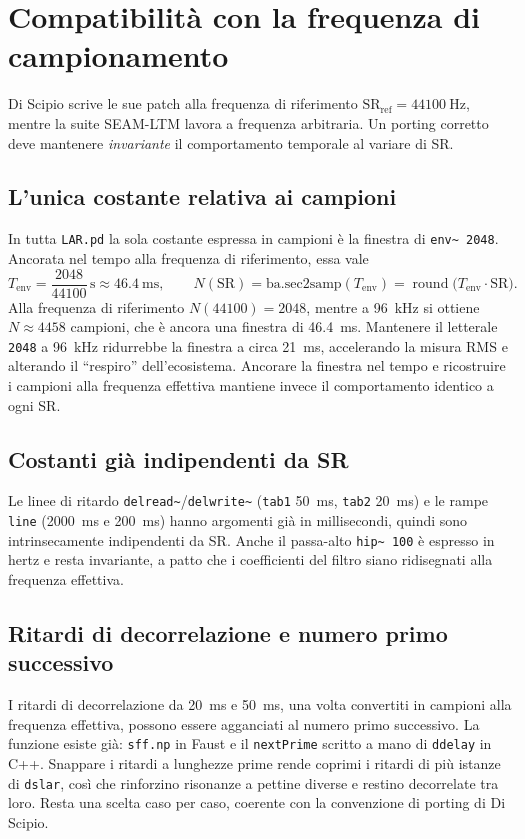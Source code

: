 \documentclass[11pt,a4paper]{article}
\begin{document}
\section{Compatibilità con la frequenza di campionamento}\label{sec:sr}
Di Scipio scrive le sue patch alla frequenza di riferimento $\text{SR}_{\text{ref}} = \SI{44100}{\hertz}$, mentre la suite SEAM-LTM lavora a frequenza arbitraria.
Un porting corretto deve mantenere \emph{invariante} il comportamento temporale al variare di SR.

\subsection{L'unica costante relativa ai campioni}
In tutta \texttt{LAR.pd} la sola costante espressa in campioni è la finestra di \texttt{env\textasciitilde{} 2048}.
Ancorata nel tempo alla frequenza di riferimento, essa vale
\begin{equation*}
T_{\text{env}} = \frac{2048}{44100}\,\text{s} \approx \SI{46.4}{\milli\second},
\qquad N(\text{SR}) = \mathrm{ba.sec2samp}(T_{\text{env}}) = \operatorname{round}\!\big(T_{\text{env}}\cdot \text{SR}\big).
\end{equation*}
Alla frequenza di riferimento $N(44100) = 2048$, mentre a \SI{96}{\kilo\hertz} si ottiene $N \approx 4458$ campioni, che è ancora una finestra di \SI{46.4}{\milli\second}.
Mantenere il letterale \texttt{2048} a \SI{96}{\kilo\hertz} ridurrebbe la finestra a circa \SI{21}{\milli\second}, accelerando la misura RMS e alterando il ``respiro'' dell'ecosistema.
Ancorare la finestra nel tempo e ricostruire i campioni alla frequenza effettiva mantiene invece il comportamento identico a ogni SR.

\subsection{Costanti già indipendenti da SR}
Le linee di ritardo \texttt{delread\textasciitilde{}}/\texttt{delwrite\textasciitilde{}} (\texttt{tab1} \SI{50}{\milli\second}, \texttt{tab2} \SI{20}{\milli\second}) e le rampe \texttt{line} (\SI{2000}{\milli\second} e \SI{200}{\milli\second}) hanno argomenti già in millisecondi, quindi sono intrinsecamente indipendenti da SR.
Anche il passa-alto \texttt{hip\textasciitilde{} 100} è espresso in hertz e resta invariante, a patto che i coefficienti del filtro siano ridisegnati alla frequenza effettiva.

\subsection{Ritardi di decorrelazione e numero primo successivo}
I ritardi di decorrelazione da \SI{20}{\milli\second} e \SI{50}{\milli\second}, una volta convertiti in campioni alla frequenza effettiva, possono essere agganciati al numero primo successivo.
La funzione esiste già: \texttt{sff.np} in Faust e il \texttt{nextPrime} scritto a mano di \texttt{ddelay} in C++.
Snappare i ritardi a lunghezze prime rende coprimi i ritardi di più istanze di \texttt{dslar}, così che rinforzino risonanze a pettine diverse e restino decorrelate tra loro.
Resta una scelta caso per caso, coerente con la convenzione di porting di Di Scipio.
\end{document}
